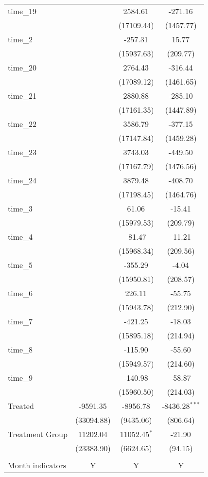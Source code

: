 \begin{table}[!htbp]
\begin{tabular}{@{\extracolsep{5pt}}lccc}
 time_19 & & 2584.61$^{}$ & -271.16$^{}$ \\
  & & (17109.44) & (1457.77) \\
 time_2 & & -257.31$^{}$ & 15.77$^{}$ \\
  & & (15937.63) & (209.77) \\
 time_20 & & 2764.43$^{}$ & -316.44$^{}$ \\
  & & (17089.12) & (1461.65) \\
 time_21 & & 2880.88$^{}$ & -285.10$^{}$ \\
  & & (17161.35) & (1447.89) \\
 time_22 & & 3586.79$^{}$ & -377.15$^{}$ \\
  & & (17147.84) & (1459.28) \\
 time_23 & & 3743.03$^{}$ & -449.50$^{}$ \\
  & & (17167.79) & (1476.56) \\
 time_24 & & 3879.48$^{}$ & -408.70$^{}$ \\
  & & (17198.45) & (1464.76) \\
 time_3 & & 61.06$^{}$ & -15.41$^{}$ \\
  & & (15979.53) & (209.79) \\
 time_4 & & -81.47$^{}$ & -11.21$^{}$ \\
  & & (15968.34) & (209.56) \\
 time_5 & & -355.29$^{}$ & -4.04$^{}$ \\
  & & (15950.81) & (208.57) \\
 time_6 & & 226.11$^{}$ & -55.75$^{}$ \\
  & & (15943.78) & (212.90) \\
 time_7 & & -421.25$^{}$ & -18.03$^{}$ \\
  & & (15895.18) & (214.94) \\
 time_8 & & -115.90$^{}$ & -55.60$^{}$ \\
  & & (15949.57) & (214.60) \\
 time_9 & & -140.98$^{}$ & -58.87$^{}$ \\
  & & (15960.50) & (214.03) \\
 Treated & -9591.35$^{}$ & -8956.78$^{}$ & -8436.28$^{***}$ \\
  & (33094.88) & (9435.06) & (806.64) \\
 Treatment Group & 11202.04$^{}$ & 11052.45$^{*}$ & -21.90$^{}$ \\
  & (23383.90) & (6624.65) & (94.15) \\
\hline \\[-1.8ex]
 Month indicators & Y & Y & Y \\

\end{tabular}
\end{table}
